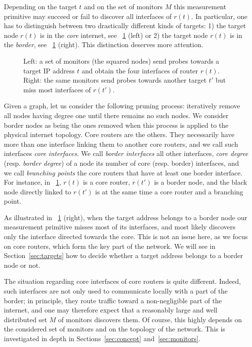 \documentclass[conference]{IEEEtran}
\begin{document}
Depending on the target $t$ and on the set of monitors $M$ this measurement primitive may succeed or fail to discover all interfaces of $r(t)$. In particular, one has to distinguish between two drastically different kinds of targets: 1) the target node $r(t)$ is in the {\em core} internet, see \figurename~\ref{fig:approach} (left) or 2) the target node $r(t)$ is in the {\em border}, see \figurename~\ref{fig:approach} (right). This distinction deserves more attention.

\begin{figure} \centering
\resizebox{.98\columnwidth}{!}{}
\caption{Left: a set of monitors (the squared nodes) send probes towards a target IP address $t$ and obtain the four interfaces of router $r(t)$. Right: the same monitors send probes towards another target $t'$ but miss most interfaces of $r(t')$.}
\label{fig:approach}
\end{figure}

Given a graph, let us consider the following pruning process: iteratively remove all nodes having degree one until there remains no such nodes. We consider border nodes as being the ones removed when this process is applied to the physical internet topology. Core routers are the others. They necessarily have more than one interface linking them to another core routers, and we call such interfaces {\em core interfaces}. We call {\em border interfaces} all other interfaces, {\em core degree} (resp. {\em border degree}) of a node its number of core (resp. border) interfaces, and we call {\em branching points} the core routers that have at least one border interface. For instance, in \figurename~\ref{fig:approach}, $r(t)$ is a core router, $r(t')$ is a border node, and the black node directly linked to $r(t')$ is at the same time a core router and a branching point.

As illustrated in \figurename~\ref{fig:approach} (right), when the target address belongs to a border node our measurement primitive misses most of its interfaces, and most likely discovers only the interface directed towards the core. This is not an issue here, as we focus on core routers, which form the key part of the network. We will see in Section~\ref{sec:targets} how to decide whether a target address belongs to a border node or not.

The situation regarding core interfaces of core routers is quite different. Indeed, such interfaces are not only used to communicate locally with a part of the border; in principle, they route traffic toward a non-negligible part of the internet, and one may therefore expect that a reasonably large and well distributed set $M$ of monitors discovers them. Of course, this highly depends on the considered set of monitors and on the topology of the network. This is investigated in depth in Sections~\ref{sec:concept} and~\ref{sec:monitors}.
\end{document}
